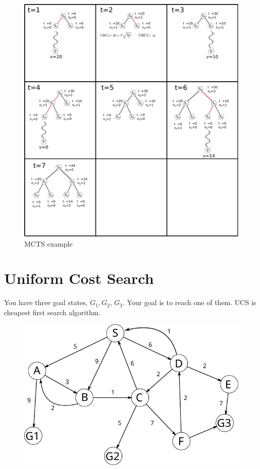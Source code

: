 \begin{figure}[h]
	\centering
	\includegraphics[scale=0.8]{./images/search_alg/mcts.pdf}
	\caption{MCTS example}
	\label{fig:mcts}
\end{figure}


\section{Uniform Cost Search}

You have three goal states, $G_1, G_2$, $G_3$. Your goal is to reach one of them. UCS is cheapest first search algorithm.

\begin{figure}[h]
	\centering
	\includegraphics[scale=0.8]{./images/search_alg/uniform_sample_graph.pdf}
\end{figure}

